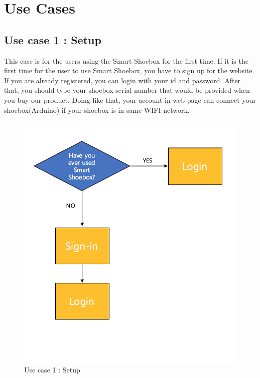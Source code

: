 \documentclass[conference]{IEEEtran}
\begin{document}
\section{Use Cases}
\subsection{Use case 1 : Setup} This case is for the users using the Smart Shoebox for the first time.  If it is the first time for the user to use Smart Shoebox, you have to sign up for the website. If you are already registered, you can login with your id and password. After that, you should type your shoebox serial number that would be provided when you buy our product. Doing like that, your account in web page can connect your shoebox(Arduino) if your shoebox is in same WIFI network.
\begin{figure}[H]
\begin{center}
    \includegraphics[scale=0.7]{usecase1}
    \caption{Use case 1 : Setup} \label{fig:label}
\end{center}
\end{figure}
\end{document}
